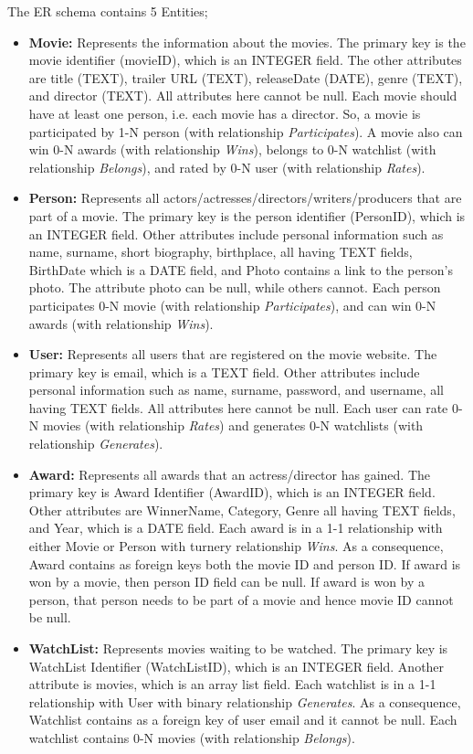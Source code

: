 The ER schema contains 5 Entities;
\begin{itemize}

\item \textbf{Movie:} Represents the information about the movies. The primary key is the movie identifier (movieID), which is an INTEGER field. The other attributes are title (TEXT), trailer URL (TEXT), releaseDate (DATE), genre (TEXT), and director (TEXT). All attributes here cannot be null. Each movie should have at least one person, i.e. each movie has a director. So, a movie is participated by 1-N person (with relationship \textit{Participates}). A movie also can win 0-N awards (with relationship \textit{Wins}), belongs to 0-N watchlist (with relationship \textit{Belongs}), and rated by 0-N user (with relationship \textit{Rates}).

\item \textbf{Person:} Represents all actors/actresses/directors/writers/producers that are part of a movie. The primary key is the person identifier (PersonID), which is an INTEGER field. Other attributes include personal information such as name, surname, short biography, birthplace, all having TEXT fields, BirthDate which is a DATE field, and Photo contains a link to the person's photo. The attribute photo can be null, while others cannot. Each person participates 0-N movie (with relationship \textit{Participates}), and can win 0-N awards (with relationship \textit{Wins}).

\item \textbf{User:} Represents all users that are registered on the movie website. The primary key is email, which is a TEXT field. Other attributes include personal information such as name, surname, password, and username, all having TEXT fields. All attributes here cannot be null. Each user can rate 0-N movies (with relationship \textit{Rates}) and generates 0-N watchlists (with relationship \textit{Generates}).

\item \textbf{Award:} Represents all awards that an actress/director has gained. The primary key is Award Identifier (AwardID), which is an INTEGER field. Other attributes are WinnerName, Category, Genre all having TEXT fields, and Year, which is a DATE field. Each award is in a 1-1 relationship with either Movie or Person with turnery relationship \textit{Wins}. As a consequence, Award contains as foreign keys both the movie ID and person ID. If award is won by a movie, then person ID field can be null. If award is won by a person, that person needs to be part of a movie and hence movie ID cannot be null. 

\item \textbf{WatchList:} Represents movies waiting to be watched. The primary key is WatchList Identifier (WatchListID), which is an INTEGER field. Another attribute is movies, which is an array list field. Each watchlist is in a 1-1 relationship with User with binary relationship \textit{Generates}. As a consequence, Watchlist contains as a foreign key of user email and it cannot be null. Each watchlist contains 0-N movies (with relationship \textit{Belongs}). 

\end{itemize}